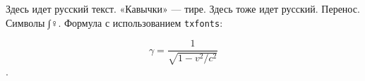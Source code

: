 ﻿\documentclass{article}
\begin{document}
Здесь идет русский текст. «Кавычки» — тире.
\textsf{Здесь тоже идет русский}. Перенос.
Символы ∫♀. Формула с использованием \texttt{txfonts}:

\[ \gamma = \frac{1}{\sqrt{1 - v^2/c^2}} \].
\end{document}

